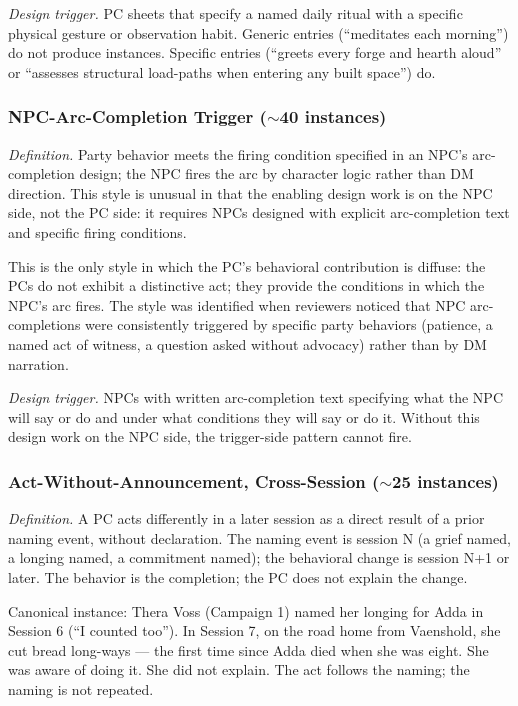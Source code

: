 \textit{Design trigger.} PC sheets that specify a named daily ritual with a specific
physical gesture or observation habit. Generic entries (``meditates each morning'') do
not produce instances. Specific entries (``greets every forge and hearth aloud'' or
``assesses structural load-paths when entering any built space'') do.

\subsubsection{NPC-Arc-Completion Trigger ($\sim$40 instances)}

\textit{Definition.} Party behavior meets the firing condition specified in an NPC's
arc-completion design; the NPC fires the arc by character logic rather than DM
direction. This style is unusual in that the enabling design work is on the NPC side,
not the PC side: it requires NPCs designed with explicit arc-completion text and
specific firing conditions.

This is the only style in which the PC's behavioral contribution is diffuse: the PCs
do not exhibit a distinctive act; they provide the conditions in which the NPC's arc
fires. The style was identified when reviewers noticed that NPC arc-completions were
consistently triggered by specific party behaviors (patience, a named act of witness,
a question asked without advocacy) rather than by DM narration.

\textit{Design trigger.} NPCs with written arc-completion text specifying what the NPC
will say or do and under what conditions they will say or do it. Without this design
work on the NPC side, the trigger-side pattern cannot fire.

\subsubsection{Act-Without-Announcement, Cross-Session ($\sim$25 instances)}

\textit{Definition.} A PC acts differently in a later session as a direct result of a
prior naming event, without declaration. The naming event is session N (a grief named,
a longing named, a commitment named); the behavioral change is session N+1 or later.
The behavior is the completion; the PC does not explain the change.

Canonical instance: Thera Voss (Campaign 1) named her longing for Adda in Session 6
(``I counted too''). In Session 7, on the road home from Vaenshold, she cut bread
long-ways --- the first time since Adda died when she was eight. She was aware of
doing it. She did not explain. The act follows the naming; the naming is not
repeated.

